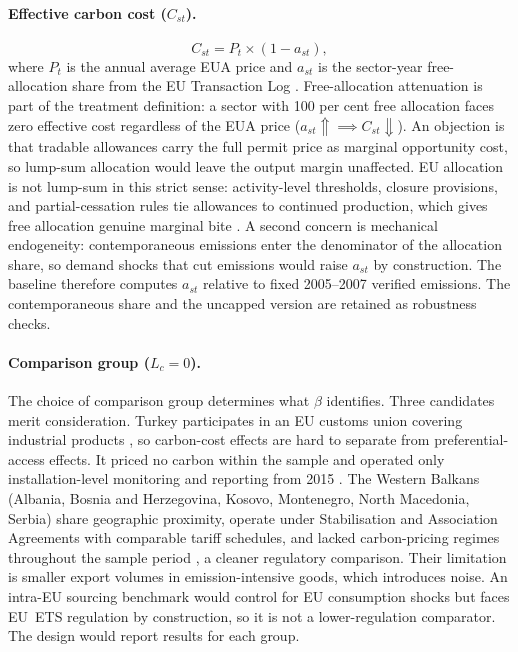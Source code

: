 \paragraph{Effective carbon cost ($C_{st}$).}
\begin{equation}
\label{eq:cst}
C_{st} = P_t \times (1 - a_{st}),
\end{equation}
where $P_t$ is the annual average EUA price \citep{eeaprice} and $a_{st}$ is the sector-year free-allocation share from the EU Transaction Log \citep{eutl}. Free-allocation attenuation is part of the treatment definition: a sector with 100 per cent free allocation faces zero effective cost regardless of the EUA price ($a_{st} \Uparrow \implies C_{st} \Downarrow$). An objection is that tradable allowances carry the full permit price as marginal opportunity cost, so lump-sum allocation would leave the output margin unaffected. EU allocation is not lump-sum in this strict sense: activity-level thresholds, closure provisions, and partial-cessation rules tie allowances to continued production, which gives free allocation genuine marginal bite \citep{far2011}. A second concern is mechanical endogeneity: contemporaneous emissions enter the denominator of the allocation share, so demand shocks that cut emissions would raise $a_{st}$ by construction. The baseline therefore computes $a_{st}$ relative to fixed 2005--2007 verified emissions. The contemporaneous share and the uncapped version are retained as robustness checks.

\paragraph{Comparison group ($L_c = 0$).}
The choice of comparison group determines what $\beta$ identifies. Three candidates merit consideration. Turkey participates in an EU customs union covering industrial products \citep{customs1995}, so carbon-cost effects are hard to separate from preferential-access effects. It priced no carbon within the sample and operated only installation-level monitoring and reporting from 2015 \citep{icap2026}. The Western Balkans (Albania, Bosnia and Herzegovina, Kosovo, Montenegro, North Macedonia, Serbia) share geographic proximity, operate under Stabilisation and Association Agreements with comparable tariff schedules, and lacked carbon-pricing regimes throughout the sample period \citep{worldbank2026}, a cleaner regulatory comparison. Their limitation is smaller export volumes in emission-intensive goods, which introduces noise. An intra-EU sourcing benchmark would control for EU consumption shocks but faces EU~ETS regulation by construction, so it is not a lower-regulation comparator. The design would report results for each group.

